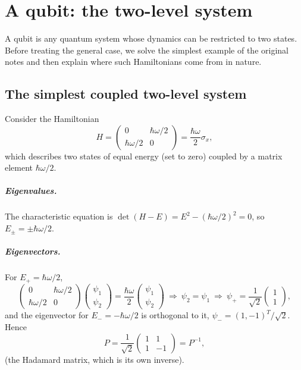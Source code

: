 \chapter{A qubit: the two-level system}\label{ch:twolevel}

A qubit is any quantum system whose dynamics can be restricted to two states. Before treating the general case,
we solve the simplest example of the original notes and then explain where such Hamiltonians come from in nature.

\section{The simplest coupled two-level system}\label{sec:simplest}
Consider the Hamiltonian
\begin{equation}\label{eq:Hsimple}
  H=\begin{pmatrix}0&\hbar\omega/2\\ \hbar\omega/2&0\end{pmatrix}=\frac{\hbar\omega}2\sigma_x,
\end{equation}
which describes two states of equal energy (set to zero) coupled by a matrix element $\hbar\omega/2$.

\paragraph{Eigenvalues.} The characteristic equation is $\det(H-E)=E^2-(\hbar\omega/2)^2=0$, so $E_\pm=\pm\hbar\omega/2$.
\paragraph{Eigenvectors.} For $E_+=\hbar\omega/2$,
\begin{equation}
  \begin{pmatrix}0&\hbar\omega/2\\ \hbar\omega/2&0\end{pmatrix}\begin{pmatrix}\psi_1\\ \psi_2\end{pmatrix}
  =\frac{\hbar\omega}2\begin{pmatrix}\psi_1\\ \psi_2\end{pmatrix}
  \ \Longrightarrow\ \psi_2=\psi_1\ \Longrightarrow\ \psi_+=\frac1{\sqrt2}\begin{pmatrix}1\\1\end{pmatrix},
\end{equation}
and the eigenvector for $E_-=-\hbar\omega/2$ is orthogonal to it, $\psi_-=(1,-1)^T/\sqrt2$. Hence
\begin{equation}
  P=\frac1{\sqrt2}\begin{pmatrix}1&1\\1&-1\end{pmatrix}=P^{-1},
\end{equation}
(the Hadamard matrix, which is its own inverse).
